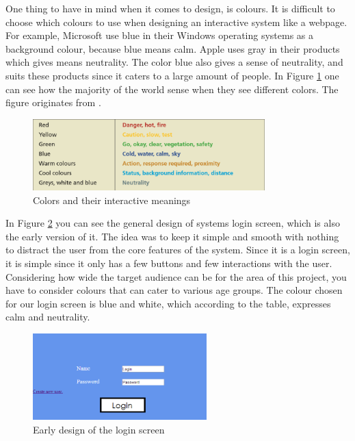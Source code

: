 One thing to have in mind when it comes to design, is colours. It is difficult to choose which colours to use when designing an interactive system like a webpage. For example, Microsoft use blue in their Windows operating systems as a background colour, because blue means calm. Apple uses gray in their products which gives means neutrality. The color blue also gives a sense of neutrality, and suits these products since it caters to a large amount of people. In Figure \ref{Colors} one can see how the majority of the world sense when they see different colors. The figure originates from \cite{DEBBook}.

\begin{figure}[htb]
\centering
\includegraphics[width=0.8\textwidth]{Images/Colors.png}
\caption{Colors and their interactive meanings}
\label{Colors}
\end{figure}

In Figure \ref{Login} you can see the general design of systems login screen, which is also the early version of it. The idea was to keep it simple and smooth with nothing to distract the user from the core features of the system. Since it is a login screen, it is simple since it only has a few buttons and few interactions with the user. Considering how wide the target audience can be for the area of this project, you have to consider colours that can cater to various age groups. The colour chosen for our login screen is blue and white, which according to the table, expresses calm and neutrality.

\begin{figure}[htb]
\centering
\includegraphics[width=0.6\textwidth]{Images/Login.png}
\caption{Early design of the login screen}
\label{Login}
\end{figure}

